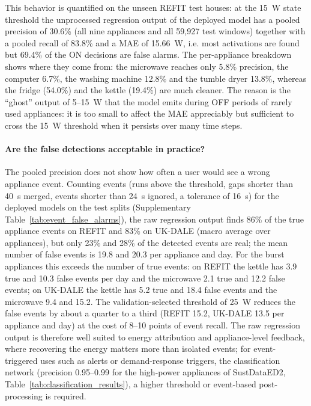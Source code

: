 \documentclass[fleqn,10pt]{wlscirep}
\begin{document}
This behavior is quantified on the unseen REFIT test houses: at the 15~W state threshold the unprocessed regression output of the deployed model has a pooled precision of 30.6\% (all nine appliances and all 59,927 test windows) together with a pooled recall of 83.8\% and a MAE of 15.66~W, i.e. most activations are found but 69.4\% of the ON decisions are false alarms. The per-appliance breakdown shows where they come from: the microwave reaches only 5.8\% precision, the computer 6.7\%, the washing machine 12.8\% and the tumble dryer 13.8\%, whereas the fridge (54.0\%) and the kettle (19.4\%) are much cleaner. The reason is the ``ghost'' output of 5--15~W that the model emits during OFF periods of rarely used appliances: it is too small to affect the MAE appreciably but sufficient to cross the 15~W threshold when it persists over many time steps.

\paragraph{Are the false detections acceptable in practice?} The pooled precision does not show how often a user would see a wrong appliance event. Counting events (runs above the threshold, gaps shorter than 40~s merged, events shorter than 24~s ignored, a tolerance of 16~s) for the deployed models on the test splits (Supplementary Table~\ref{tab:event_false_alarms}), the raw regression output finds 86\% of the true appliance events on REFIT and 83\% on UK-DALE (macro average over appliances), but only 23\% and 28\% of the detected events are real; the mean number of false events is 19.8 and 20.3 per appliance and day. For the burst appliances this exceeds the number of true events: on REFIT the kettle has 3.9 true and 10.3 false events per day and the microwave 2.1 true and 12.2 false events; on UK-DALE the kettle has 5.2 true and 18.4 false events and the microwave 9.4 and 15.2. The validation-selected threshold of 25~W reduces the false events by about a quarter to a third (REFIT 15.2, UK-DALE 13.5 per appliance and day) at the cost of 8--10 points of event recall. The raw regression output is therefore well suited to energy attribution and appliance-level feedback, where recovering the energy matters more than isolated events; for event-triggered uses such as alerts or demand-response triggers, the classification network (precision 0.95--0.99 for the high-power appliances of SustDataED2, Table~\ref{tab:classification_results}), a higher threshold or event-based post-processing is required.
\end{document}

